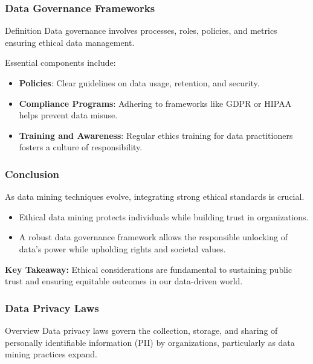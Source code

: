 \documentclass[aspectratio=169]{beamer}
\begin{document}
\begin{frame}[fragile]
    \frametitle{Data Governance Frameworks}
    \begin{block}{Definition}
        Data governance involves processes, roles, policies, and metrics ensuring ethical data management.
    \end{block}
    Essential components include:
    \begin{itemize}
        \item \textbf{Policies}: Clear guidelines on data usage, retention, and security.
        \item \textbf{Compliance Programs}: Adhering to frameworks like GDPR or HIPAA helps prevent data misuse.
        \item \textbf{Training and Awareness}: Regular ethics training for data practitioners fosters a culture of responsibility.
    \end{itemize}
\end{frame}

\begin{frame}[fragile]
    \frametitle{Conclusion}
    As data mining techniques evolve, integrating strong ethical standards is crucial. 
    \begin{itemize}
        \item Ethical data mining protects individuals while building trust in organizations.
        \item A robust data governance framework allows the responsible unlocking of data's power while upholding rights and societal values.
    \end{itemize}
    \textbf{Key Takeaway:} Ethical considerations are fundamental to sustaining public trust and ensuring equitable outcomes in our data-driven world.
\end{frame}

\begin{frame}[fragile]
    \frametitle{Data Privacy Laws}
    \begin{block}{Overview}
        Data privacy laws govern the collection, storage, and sharing of personally identifiable information (PII) by organizations, particularly as data mining practices expand.
    \end{block}
\end{frame}
\end{document}
